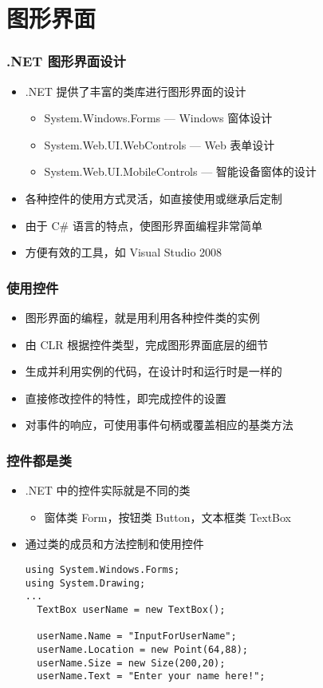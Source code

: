 
\section{图形界面}

\begin{frame}
\frametitle{.NET 图形界面设计}
\begin{itemize}
\setlength{\itemsep}{8pt plus 1pt}
\item .NET 提供了丰富的类库进行图形界面的设计
\begin{itemize}
\item System.Windows.Forms --- Windows 窗体设计
\item System.Web.UI.WebControls --- Web 表单设计
\item System.Web.UI.MobileControls --- 智能设备窗体的设计
\end{itemize}
\item 各种控件的使用方式灵活，如直接使用或继承后定制
\item 由于 C\# 语言的特点，使图形界面编程非常简单
\item 方便有效的工具，如 Visual Studio 2008 
\end{itemize}
\end{frame}

\begin{frame}
\frametitle{使用控件}
\begin{itemize}
\setlength{\itemsep}{8pt plus 1pt}
\item 图形界面的编程，就是用利用各种控件类的实例
\item 由 CLR 根据控件类型，完成图形界面底层的细节
\item 生成并利用实例的代码，在设计时和运行时是一样的
\item 直接修改控件的特性，即完成控件的设置
\item 对事件的响应，可使用事件句柄或覆盖相应的基类方法
\end{itemize}
\end{frame}

\begin{frame}[fragile]
\frametitle{控件都是类}
\begin{itemize}
\item .NET 中的控件实际就是不同的类
  \begin{itemize}
  \item 窗体类 Form，按钮类 Button，文本框类 TextBox
  \end{itemize}
\item 通过类的成员和方法控制和使用控件
\begin{lstlisting}
using System.Windows.Forms;
using System.Drawing;
...
  TextBox userName = new TextBox();
  
  userName.Name = "InputForUserName";
  userName.Location = new Point(64,88);
  userName.Size = new Size(200,20);
  userName.Text = "Enter your name here!";
\end{lstlisting}
\end{itemize}
\end{frame}

